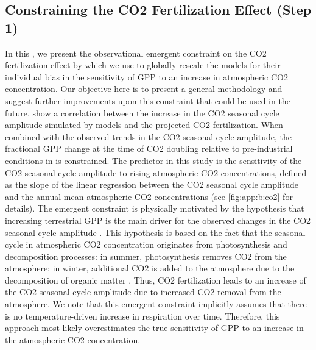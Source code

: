 \subsection{Constraining the \texorpdfstring{\acs{CO2}}{CO}
  Fertilization Effect (Step 1)}
\label{subsec:06:step_1}

In this , we present the observational emergent
constraint on the \ac{CO2} fertilization effect by \textcite{Wenzel2016} which
we use to globally rescale the models for their individual bias in the
sensitivity of \ac{GPP} to an increase in atmospheric \ac{CO2} concentration.
Our objective here is to present a general methodology and suggest further
improvements upon this constraint that could be used in the future.
\Textcite{Wenzel2016} show a correlation between the increase in the \ac{CO2}
seasonal cycle amplitude simulated by models and the projected \ac{CO2}
fertilization. When combined with the observed trends in the \ac{CO2} seasonal
cycle amplitude, the fractional \ac{GPP} change at the time of \ac{CO2}
doubling relative to pre-industrial conditions in  is constrained.
The predictor in this study is the sensitivity of the \ac{CO2} seasonal cycle
amplitude to rising atmospheric \ac{CO2} concentrations, defined as the slope
of the linear regression between the \ac{CO2} seasonal cycle amplitude and the
annual mean atmospheric \ac{CO2} concentrations (see \cref{fig:app:b:co2} for
details). The emergent constraint is physically motivated by the hypothesis
that increasing terrestrial \ac{GPP} is the main driver for the observed
changes in the \ac{CO2} seasonal cycle amplitude \autocite{Gray2014,
  Keeling1996, Zhao2014}. This hypothesis is based on the fact that the
seasonal cycle in atmospheric \ac{CO2} concentration originates from
photosynthesis and decomposition processes: in summer, photosynthesis removes
\ac{CO2} from the atmosphere; in winter, additional \ac{CO2} is added to the
atmosphere due to the decomposition of organic matter \autocite{Keeling1995}.
Thus, \ac{CO2} fertilization leads to an increase of the \acs{CO2} seasonal
cycle amplitude due to increased \acs{CO2} removal from the atmosphere. We note
that this emergent constraint implicitly assumes that there is no
temperature-driven increase in respiration over time. Therefore, this approach
most likely overestimates the true sensitivity of \ac{GPP} to an increase in
the atmospheric \ac{CO2} concentration.

